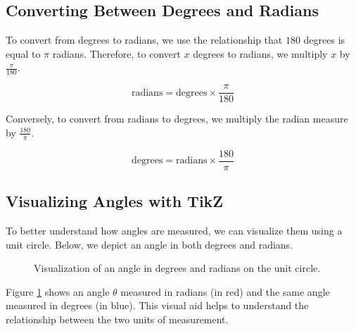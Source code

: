 \documentclass[a4paper,12pt]{book}
\begin{document}
\subsection{Converting Between Degrees and Radians}
\label{subsec:converting_degrees_radians}

To convert from degrees to radians, we use the relationship that \(180\) degrees is equal to \(\pi\) radians. Therefore, to convert \(x\) degrees to radians, we multiply \(x\) by \(\frac{\pi}{180}\).

\[
\text{radians} = \text{degrees} \times \frac{\pi}{180}
\]

Conversely, to convert from radians to degrees, we multiply the radian measure by \(\frac{180}{\pi}\).

\[
\text{degrees} = \text{radians} \times \frac{180}{\pi}
\]

\subsection{Visualizing Angles with TikZ}
\label{subsec:visualizing_angles}

To better understand how angles are measured, we can visualize them using a unit circle. Below, we depict an angle in both degrees and radians.

\begin{figure}[ht!]
\centering
{}
\caption{Visualization of an angle in degrees and radians on the unit circle.}
\label{fig:angles_visualization}
\end{figure}

Figure \ref{fig:angles_visualization} shows an angle $\theta$ measured in radians (in red) and the same angle measured in degrees (in blue). This visual aid helps to understand the relationship between the two units of measurement.
\end{document}
